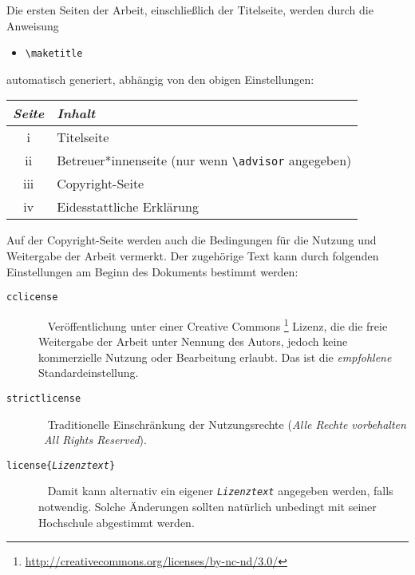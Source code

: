 Die ersten Seiten der Arbeit, einschließlich der Titelseite,
werden durch die Anweisung
\begin{itemize}
\item[] \verb!\maketitle!  
\end{itemize}
automatisch generiert, abhängig von den obigen Einstellungen:
%
\begin{center}
\begin{tabular}{cl}
\emph{Seite} & \emph{Inhalt} \\
  \hline
  \textrm{i} & Titelseite  \\
  \textrm{ii} & Betreuer*innenseite (nur wenn \verb!\advisor! angegeben) \\
	\textrm{iii} & Copyright-Seite \\
  \textrm{iv} & Eidesstattliche Erklärung \\
  \hline
\end{tabular}
\end{center}
%
Auf der Copyright-Seite werden auch die Bedingungen für die Nutzung 
und Weitergabe der Arbeit vermerkt. Der zugehörige Text kann durch
folgenden Einstellungen am Beginn des Dokuments bestimmt werden:
%
\begin{description}
\item[\normalfont\texttt{{\bs}cclicense}] ~ \newline
	Veröffentlichung unter einer Creative Commons%
	\footnote{\url{http://creativecommons.org/licenses/by-nc-nd/3.0/}}
	Lizenz, die die freie Weitergabe der Arbeit unter Nennung des Autors, jedoch
	keine kommerzielle Nutzung oder Bearbeitung erlaubt.
	Das ist die \emph{empfohlene} Standardeinstellung.
\item[\normalfont\texttt{{\bs}strictlicense}] ~ \newline 
	Traditionelle Einschränkung der Nutzungsrechte 
	(\emph{Alle Rechte vorbehalten} \bzw\ \emph{All Rights Reserved}).
\item[\normalfont\texttt{{\bs}license\{\emph{Lizenztext}\}}] ~ \newline
	Damit kann alternativ ein eigener \texttt{\emph{Lizenztext}} angegeben werden, 
	falls notwendig. Solche Änderungen sollten natürlich unbedingt mit seiner 
	Hochschule abgestimmt werden.
\end{description}





